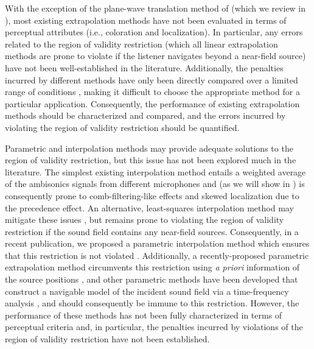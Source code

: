 With the exception of the plane-wave translation method of \citet{SchultzSpors2013} (which we review in ), most existing extrapolation methods have not been evaluated in terms of perceptual attributes (i.e., coloration and localization).
In particular, any errors related to the region of validity restriction (which all linear extrapolation methods are prone to violate if the listener navigates beyond a near-field source) have not been well-established in the literature.
Additionally, the penalties incurred by different methods have only been directly compared over a limited range of conditions \citep{TylkaChoueiri2015}, making it difficult to choose the appropriate method for a particular application.
Consequently, the performance of existing extrapolation methods should be characterized and compared, and the errors incurred by violating the region of validity restriction should be quantified.

Parametric and interpolation methods may provide adequate solutions to the region of validity restriction, but this issue has not been explored much in the literature.
The simplest existing interpolation method entails a weighted average of the ambisonics signals from different microphones \citep{Southern2009} and (as we will show in ) is consequently prone to comb-filtering-like effects and skewed localization due to the precedence effect.
An alternative, least-squares interpolation method may mitigate these issues \citep{Samarasinghe2014a}, but remains prone to violating the region of validity restriction if the sound field contains any near-field sources.
Consequently, in a recent publication, we proposed a parametric interpolation method which ensures that this restriction is not violated \citep{TylkaChoueiri2016}.
Additionally, a recently-proposed parametric extrapolation method circumvents this restriction using \textit{a priori} information of the source positions \citep{Wakayama2017}, and other parametric methods have been developed that construct a navigable model of the incident sound field via a time-frequency analysis \citep{Thiergart2013,Zheng2013PhD,Plinge2018}, and should consequently be immune to this restriction.
However, the performance of these methods has not been fully characterized in terms of perceptual criteria and, in particular, the penalties incurred by violations of the region of validity restriction have not been established.

